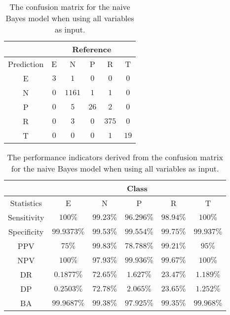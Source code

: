 \documentclass[preprint,12pt]{elsarticle}
\begin{document}
\begin{table}[!ht]
	\centering
	\begin{tabular}{|c|c|c|c|c|c|}
		\hline
		 & \multicolumn{5}{|c|}{Reference} \\ \hline
		 Prediction & E & N & P & R & T \\ \hline
		 E & $3$ & $1$ & $0$ & $0$ & $0$ \\ \hline
		 N & $0$ & $1161$ & $1$ & $1$ & $0$ \\ \hline
		 P & $0$ & $5$ & $26$ & $2$ & $0$ \\ \hline
		 R & $0$ & $3$ & $0$ & $375$ & $0$ \\ \hline
		 T & $0$ & $0$ & $0$ & $1$ & $19$ \\ \hline
	\end{tabular}
	\caption{The confusion matrix for the naive Bayes model when using all variables as input.}
	\label{tab:cm:all:nb}
\end{table}

\begin{table}[!ht]
	\centering
	\begin{tabular}{|c|c|c|c|c|c|}
		\hline
		 & \multicolumn{5}{c|}{Class} \\ \hline
		Statistics & E & N & P & R & T \\ \hline
		Sensitivity & $100\%$ & $99.23\%$ & $96.296\%$ & $98.94\%$ & $100\%$ \\ \hline
		Specificity & $99.9373\%$ & $99.53\%$ & $99.554\%$ & $99.75\%$ & $99.937\%$ \\ \hline
		PPV & $75\%$ & $99.83\%$ & $78.788\%$ & $99.21\%$ & $95\%$ \\ \hline
		NPV & $100\%$ & $97.93\%$ & $99.936\%$ & $99.67\%$ & $100\%$ \\ \hline
		DR & $0.1877\%$ & $72.65\%$ & $1.627\%$ & $23.47\%$ & $1.189\%$ \\ \hline
		DP & $0.2503\%$ & $72.78\%$ & $2.065\%$ & $23.65\%$ & $1.252\%$ \\ \hline
		BA & $99.9687\%$ & $99.38\%$ & $97.925\%$ & $99.35\%$ & $99.968\%$ \\ \hline
	\end{tabular}
	\caption{The performance indicators derived from the confusion matrix for the naive Bayes model when using all variables as input.}
	\label{tab:cs:reverse:all:nb}
\end{table}
\end{document}
